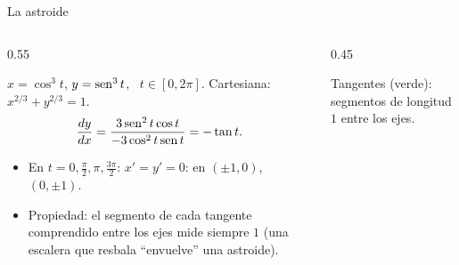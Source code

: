 \documentclass[10pt,aspectratio=169]{beamer}
\begin{document}
\begin{frame}{La astroide}
  \begin{columns}
    \begin{column}{0.55\textwidth}
      \begin{ejemplo}[2]
        $x=\cos^3t$, $y=\operatorname{sen}^3t$, \ $t\in[0,2\pi]$. Cartesiana: $x^{2/3}+y^{2/3}=1$.
        \[ \frac{dy}{dx}=\frac{3\operatorname{sen}^2t\cos t}{-3\cos^2t\operatorname{sen} t}=-\tan t. \]
        \begin{itemize}
          \item En $t=0,\frac\pi2,\pi,\frac{3\pi}2$: $x'=y'=0$:  en $(\pm1,0)$, $(0,\pm1)$.
          \item Propiedad: el segmento de cada tangente comprendido entre los ejes mide siempre $1$ (una escalera que resbala ``envuelve'' una astroide).
        \end{itemize}
      \end{ejemplo}
    \end{column}
    \begin{column}{0.45\textwidth}
      \centering

      \small Tangentes (verde): segmentos de longitud $1$ entre los ejes.
    \end{column}
  \end{columns}
\end{frame}
\end{document}
